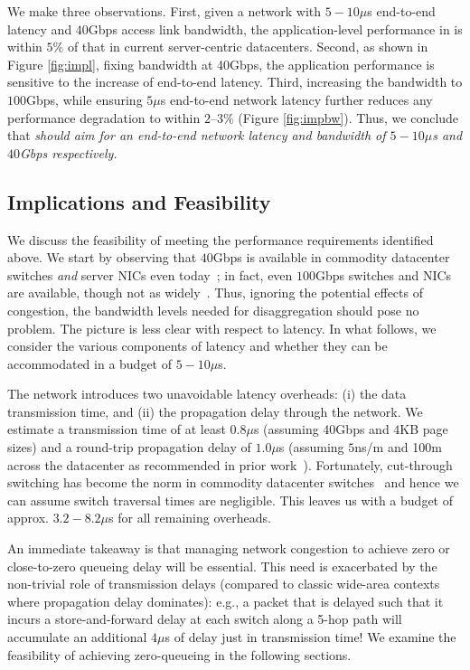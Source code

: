 We make three observations. First, given a network with $5-10\mu$s end-to-end latency and $40$Gbps access link bandwidth, the application-level performance in \dis is within $5\%$ of that in current server-centric datacenters. 
Second, as shown in Figure \ref{fig:impl}, fixing bandwidth at 40Gbps, the application performance is sensitive to the increase of end-to-end latency.
Third, increasing the bandwidth to $100$Gbps, while ensuring $5\mu$s end-to-end network latency further reduces any performance degradation to within $2$--$3\%$ (Figure \ref{fig:impbw}).
Thus, we conclude that \emph{\dis should aim for an end-to-end network latency and bandwidth of $5-10\mu$s and $40$Gbps respectively.}

\subsection{Implications and Feasibility}
\label{ssec:rtt}

We discuss the feasibility of meeting the performance requirements identified above. We start by observing that $40$Gbps is available in commodity datacenter switches \emph{and} server NICs even today~\cite{40gnic}; in fact, even $100$Gbps switches and NICs are available, though not as widely~\cite{100gnic}.
Thus, ignoring the potential effects of congestion, the bandwidth levels needed for disaggregation should pose no problem.
The picture is less clear with respect to latency. In what follows, we consider the various components of latency and whether they can be accommodated in a budget of $5-10\mu$s. 

The network introduces two unavoidable latency overheads: (i) the data transmission time, and (ii) the propagation delay through the network. We estimate a  transmission time of at least $0.8\mu$s (assuming $40$Gbps and $4$KB page sizes) 
and a round-trip propagation delay of $1.0\mu$s (assuming $5$ns/m and 100m across the datacenter as recommended in prior work~\cite{lowlatency}).
Fortunately, cut-through switching has become the norm in commodity datacenter switches~\cite{arista,broadcom} and hence we can assume switch traversal times are negligible. 
This leaves us with a budget of approx. $3.2-8.2\mu$s for all remaining overheads.

An immediate takeaway is that managing network congestion to achieve zero or close-to-zero queueing delay will be essential. This need is exacerbated by the 
non-trivial role of transmission delays (compared to classic wide-area contexts where propagation delay dominates): e.g., a packet that is delayed such that it incurs a store-and-forward delay at each switch along a 5-hop path will accumulate an additional $4\mu$s of delay just in transmission time! We examine the feasibility of achieving zero-queueing in the following sections. 

